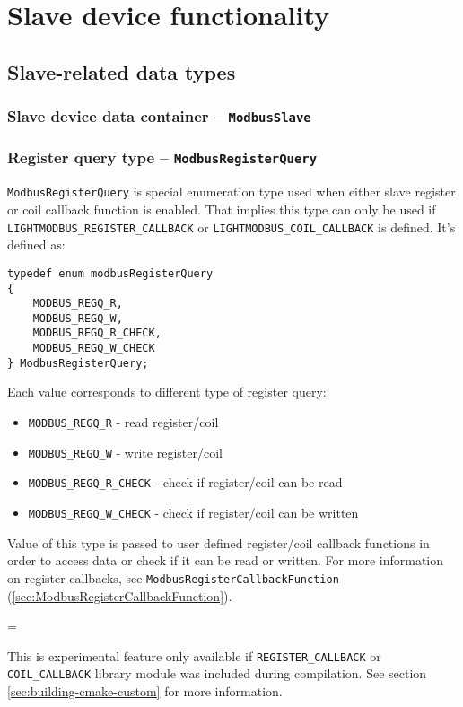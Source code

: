 \documentclass[11pt,a4paper]{article}
\newenvironment{warning}
{
	\par\begin{mdframed}[linewidth=0.5pt,linecolor=black]%
	\begin{list}{}{\leftmargin=1cm
	\labelwidth=\leftmargin}\item[\Large\ding{43}]
}
{	
	\end{list}\end{mdframed}\par
}
\newcommand{\coderef}[1]{\texttt{{#1}} (\ref{sec:#1})}
\newcommand{\warnbox}[1]{\vspace{0.2cm}\begin{warning}{#1}\end{warning}\vspace{0.2cm}}
\begin{document}
\section{Slave device functionality}

\subsection{Slave-related data types}
\subsubsection{Slave device data container -- \texttt{ModbusSlave}} \label{sec:ModbusSlave}
\subsubsection{Register query type -- \texttt{ModbusRegisterQuery}} \label{sec:ModbusRegisterQuery}
\texttt{ModbusRegisterQuery} is special enumeration type used when either slave register or coil callback function is enabled. That implies this type can only be used if \texttt{LIGHTMODBUS\_REGISTER\_CALLBACK} or \texttt{LIGHTMODBUS\_COIL\_CALLBACK} is defined. It's defined as:

\begin{lstlisting}[frame=single]
typedef enum modbusRegisterQuery
{
	MODBUS_REGQ_R,
	MODBUS_REGQ_W,
	MODBUS_REGQ_R_CHECK,
	MODBUS_REGQ_W_CHECK
} ModbusRegisterQuery;
\end{lstlisting}

Each value corresponds to different type of register query:
\begin{itemize}
	\setlength\itemsep{0.1em}
	\item \texttt{MODBUS\_REGQ\_R} - read register/coil
	\item \texttt{MODBUS\_REGQ\_W} - write register/coil
	\item \texttt{MODBUS\_REGQ\_R\_CHECK} - check if register/coil can be read
	\item \texttt{MODBUS\_REGQ\_W\_CHECK} - check if register/coil can be written
\end{itemize}

Value of this type is passed to user defined register/coil callback functions in order to access data or check if it can be read or written. For more information on register callbacks, see \coderef{ModbusRegisterCallbackFunction}.

\warnbox{This is experimental feature only available if \texttt{REGISTER\_CALLBACK} or \texttt{COIL\_CALLBACK} library module was included during compilation. See section \ref{sec:building-cmake-custom} for more information. }
\end{document}
